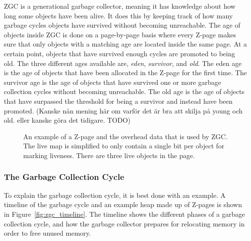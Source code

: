 \begin{description}
        ZGC is a generational garbage collector, meaning it has knowledge about how long some objects have been alive. It does this by keeping track of how many garbage cycles objects have survived without becoming unreachable. The age of objects inside ZGC is done on a page-by-page basis where every Z-page makes sure that only objects with a matching age are located inside the same page. At a certain point, objects that have survived enough cycles are promoted to being old. The three different ages available are, \textit{eden}, \textit{survivor}, and \textit{old}. The eden age is the age of objects that have been allocated in the Z-page for the first time. The survivor age is the age of objects that have survived one or more garbage collection cycles without becoming unreachable. The old age is the age of objects that have surpassed the threshold for being a survivor and instead have been promoted. (Kanske nån mening här om varför det är bra att skilja på young och old. eller kanske göra det tidigare. TODO)
\end{description}

\begin{figure}[H]
    \centering
    
    \caption[]
    {An example of a Z-page and the overhead data that is used by ZGC. The live map is simplified to only contain a single bit per object for marking liveness. There are three live objects in the page.} 
    \label{fig:zpages}
\end{figure}

\subsubsection{The Garbage Collection Cycle}
To explain the garbage collection cycle, it is best done with an example. A timeline of the garbage cycle and an example heap made up of Z-pages is shown in Figure~\ref{fig:zgc_timeline}. The timeline shows the different phases of a garbage collection cycle, and how the garbage collector prepares for relocating memory in order to free unused memory.

